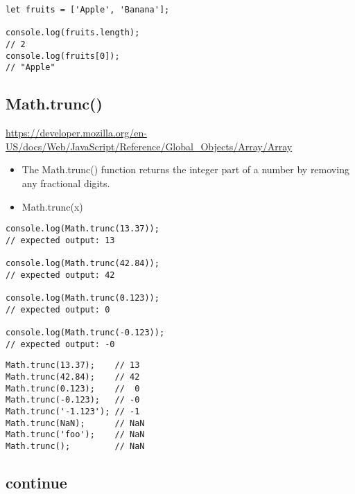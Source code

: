 \documentclass[10pt]{article}
\begin{document}
\begin{lstlisting}[title=Example using literal notation, captionpos=t]
let fruits = ['Apple', 'Banana'];

console.log(fruits.length); 
// 2
console.log(fruits[0]);     
// "Apple"
\end{lstlisting}

\medskip %







\medskip %
\pagebreak
\subsection{Math.trunc()}

\url{https://developer.mozilla.org/en-US/docs/Web/JavaScript/Reference/Global_Objects/Array/Array}

\begin{itemize}
	\item The Math.trunc() function returns the integer part of a number by removing any fractional digits.
	\item Math.trunc(x)
\end{itemize}

\begin{lstlisting}[title=Example Math.trunc(), captionpos=t]
console.log(Math.trunc(13.37));
// expected output: 13

console.log(Math.trunc(42.84));
// expected output: 42

console.log(Math.trunc(0.123));
// expected output: 0

console.log(Math.trunc(-0.123));
// expected output: -0
\end{lstlisting}

\begin{lstlisting}[title=Example Math.trunc(), captionpos=t]
Math.trunc(13.37);    // 13
Math.trunc(42.84);    // 42
Math.trunc(0.123);    //  0
Math.trunc(-0.123);   // -0
Math.trunc('-1.123'); // -1
Math.trunc(NaN);      // NaN
Math.trunc('foo');    // NaN
Math.trunc();         // NaN
\end{lstlisting}
\medskip %










\medskip %
\pagebreak
\subsection{continue}
\end{document}

